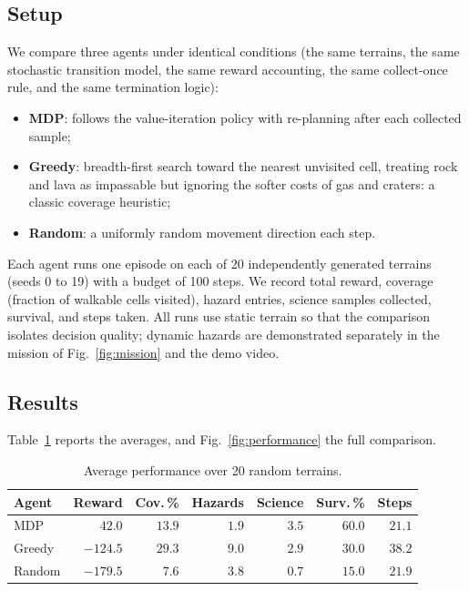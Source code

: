 \documentclass[conference]{IEEEtran}
\begin{document}
\subsection{Setup}

We compare three agents under identical conditions (the same terrains, the same stochastic transition model, the same reward accounting, the same collect-once rule, and the same termination logic):

\begin{itemize}
  \item \textbf{MDP}: follows the value-iteration policy with re-planning after each collected sample;
  \item \textbf{Greedy}: breadth-first search toward the nearest unvisited cell, treating rock and lava as impassable but ignoring the softer costs of gas and craters: a classic coverage heuristic;
  \item \textbf{Random}: a uniformly random movement direction each step.
\end{itemize}

Each agent runs one episode on each of 20 independently generated terrains (seeds 0 to 19) with a budget of 100 steps. We record total reward, coverage (fraction of walkable cells visited), hazard entries, science samples collected, survival, and steps taken. All runs use static terrain so that the comparison isolates decision quality; dynamic hazards are demonstrated separately in the mission of Fig.~\ref{fig:mission} and the demo video.

\subsection{Results}

Table~\ref{tab:results} reports the averages, and Fig.~\ref{fig:performance} the full comparison.

\begin{table}[t]
  \caption{Average performance over 20 random terrains.}
  \label{tab:results}
  \centering
  \setlength{\tabcolsep}{4pt}
  \begin{tabular}{lrrrrrr}
    \toprule
    Agent & Reward & Cov.\,\% & Hazards & Science & Surv.\,\% & Steps \\
    \midrule
    MDP    & $\mathbf{42.0}$ & $13.9$          & $\mathbf{1.9}$ & $\mathbf{3.5}$ & $\mathbf{60.0}$ & $21.1$ \\
    Greedy & $-124.5$        & $\mathbf{29.3}$ & $9.0$          & $2.9$          & $30.0$          & $38.2$ \\
    Random & $-179.5$        & $7.6$           & $3.8$          & $0.7$          & $15.0$          & $21.9$ \\
    \bottomrule
  \end{tabular}
\end{table}
\end{document}
